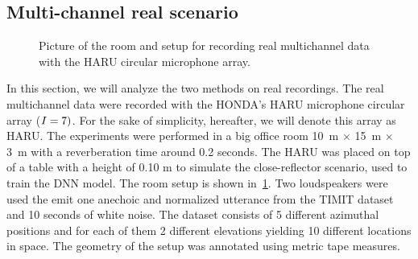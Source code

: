 \subsection{Multi-channel real scenario}
\begin{figure}[t]
    \begin{fullwidth}
    \centering
    \hfill
    \hfill
    \label{fig:mirage:room_exp}
    \caption{Picture of the room and setup for recording real multichannel data with the HARU circular microphone array.}
    \end{fullwidth}
\end{figure}
In this section, we will analyze the two methods on real recordings.
The real multichannel data were recorded with the HONDA's HARU microphone circular array ($I=7)$.
For the sake of simplicity, hereafter, we will denote this array as HARU.
The experiments were performed in a big office room 10~m $\times$ 15~m $\times$ 3~m with a reverberation time around 0.2 seconds.
The HARU was placed on top of a table with a height of 0.10 m to simulate the close-reflector scenario, used to train the \ac{DNN} model.
The room setup is shown in~\cref{fig:mirage:room_exp}.
Two loudspeakers were used the emit one anechoic and normalized utterance from the TIMIT dataset and 10 seconds of white noise.
The dataset consists of 5 different azimuthal positions and for each of them 2 different elevations yielding 10 different locations in space.
The geometry of the setup was annotated using metric tape measures.


